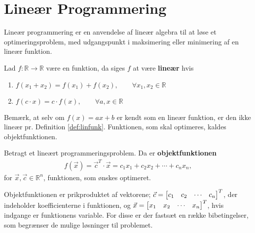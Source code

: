 \chapter{Lineær Programmering}
Lineær programmering er en anvendelse af lineær algebra til at løse et optimeringsproblem, med udgangspunkt i maksimering eller minimering af en lineær funktion.

\begin{defn}
Lad $f:\mathds{R} \to \mathds{R}$ være en funktion, da siges $f$ at være \textbf{lineær} hvis
\begin{enumerate}[label=\alph*]
\item $f(x_1 + x_2) = f(x_1) + f(x_2), \qquad \forall x_1,x_2 \in \mathds{R}$
\item $f(c\cdot x) = c \cdot f(x), \qquad \forall a, x \in \mathds{R}$
\end{enumerate}
\label{def:linfunk}
\end{defn}

Bemærk, at selv om $f(x) = ax + b$ er kendt som en lineær funktion, er den ikke lineær pr. Definition \ref{def:linfunk}.
Funktionen, som skal optimeres, kaldes objektfunktionen.
\begin{defn}
Betragt et lineært programmeringsproblem. Da er \textbf{objektfunktionen}
\begin{align*}
f(\vec{x}) = \vec{c}^T \cdot \vec{x} = c_1x_1 + c_2x_2 + \cdots + c_nx_n, 
\end{align*}
for $\vec{x}, \vec{c} \in \mathds{R}^n$, 
funktionen, som ønskes optimeret. 
\end{defn}

Objektfunktionen er prikproduktet af vektorene; $\vec{c}= \begin{bmatrix} c_1 & c_2 & \cdots & c_n \end{bmatrix}^T$, der indeholder koefficienterne i funktionen, og $\vec{x}= \begin{bmatrix} x_1 & x_2 & \cdots & x_n \end{bmatrix}^T$, hvis indgange er funktionens variable.
For disse er der fastsæt en række bibetingelser, som begrænser de mulige løsninger til problemet. 

